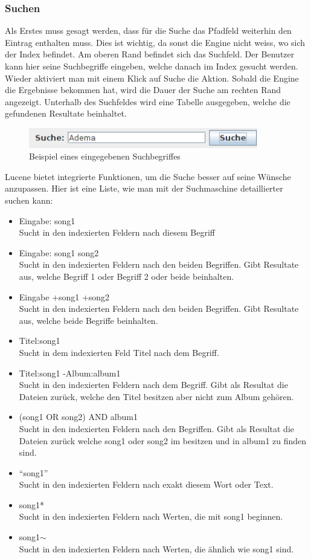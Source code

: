 \documentclass[12pt,a4paper,ngerman]{report}
\begin{document}
\subsubsection*{Suchen}
Als Erstes muss gesagt werden, dass für die Suche das Pfadfeld weiterhin den Eintrag enthalten muss. Dies ist wichtig, da sonst die Engine nicht weiss, wo sich der Index befindet. Am oberen Rand befindet sich das Suchfeld. Der Benutzer kann hier seine Suchbegriffe eingeben, welche danach im Index gesucht werden. Wieder aktiviert man mit einem Klick auf Suche die Aktion. Sobald die Engine die Ergebnisse bekommen hat, wird die Dauer der Suche am rechten Rand angezeigt. Unterhalb des Suchfeldes wird eine Tabelle ausgegeben, welche die gefundenen Resultate beinhaltet.
\begin{figure}[h!]
\centering
\includegraphics[width=10cm]{img/suche.png}
\caption{Beispiel eines eingegebenen Suchbegriffes\protect\footnotemark}
\end{figure}
Lucene bietet integrierte Funktionen, um die Suche besser auf seine Wünsche anzupassen. Hier ist eine Liste, wie man mit der Suchmaschine detaillierter suchen kann:
\begin{itemize}
	\item Eingabe: song1\\Sucht in den indexierten Feldern nach diesem Begriff
	\item Eingabe: song1 song2\\Sucht in den indexierten Feldern nach den beiden Begriffen. Gibt Resultate aus, welche Begriff 1 oder Begriff 2 oder beide beinhalten.
	\item Eingabe +song1 +song2\\Sucht in den indexierten Feldern nach den beiden Begriffen. Gibt Resultate aus, welche beide Begriffe beinhalten.
	\item Titel:song1\\Sucht in dem indexierten Feld Titel nach dem Begriff.
	\item Titel:song1 -Album:album1\\Sucht in den indexierten Feldern nach dem Begriff. Gibt als Resultat die Dateien zurück, welche den Titel besitzen aber nicht zum Album gehören.
	\item (song1 OR song2) AND album1\\Sucht in den indexierten Feldern nach den Begriffen. Gibt als Resultat die Dateien zurück welche song1 oder song2 im besitzen und in album1 zu finden sind.
	\item \textquotedblleft song1\textquotedblright \\Sucht in den indexierten Feldern nach exakt diesem Wort oder Text.
	\item song1*\\Sucht in den indexierten Feldern nach Werten, die mit song1 beginnen.
	\item song1$\sim$\\Sucht in den indexierten Feldern nach Werten, die ähnlich wie song1 sind.
\end{itemize}
\end{document}
